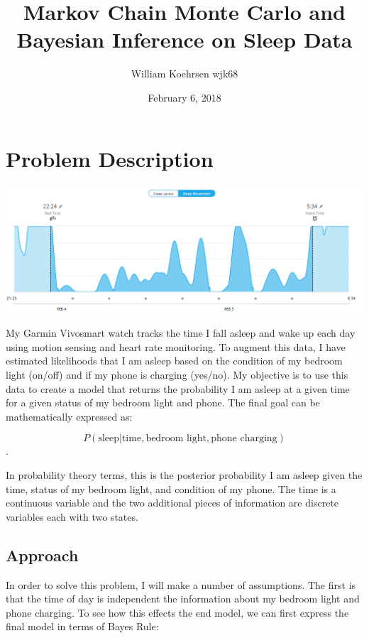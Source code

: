 \documentclass[12pt]{article}
\title{Markov Chain Monte Carlo and Bayesian Inference on Sleep Data}
\author{William Koehrsen wjk68}
\date{February 6, 2018}
\makeatletter
\def\maxwidth{\ifdim\Gin@nat@width>\linewidth\linewidth
    \else\Gin@nat@width\fi}
\let\Oldincludegraphics\includegraphics
\renewcommand{\includegraphics}[1]{\Oldincludegraphics[width=.8\maxwidth]{#1}}
\makeatother
\begin{document}
    
    
    \maketitle
    \tableofcontents
    

    
    \hypertarget{problem-description}{%
\section{Problem Description}\label{problem-description}}

\includegraphics{images/sleep_data_graph.PNG}

My Garmin Vivosmart watch tracks the time I fall asleep and wake up each
day using motion sensing and heart rate monitoring. To augment this
data, I have estimated likelihoods that I am asleep based on the
condition of my bedroom light (on/off) and if my phone is charging
(yes/no). My objective is to use this data to create a model that
returns the probability I am asleep at a given time for a given status
of my bedroom light and phone. The final goal can be mathematically
expressed as:

\[P(\text{sleep} | \text{time}, \text{bedroom light}, \text{phone charging})\].

In probability theory terms, this is the posterior probability I am
asleep given the time, status of my bedroom light, and condition of my
phone. The time is a continuous variable and the two additional pieces
of information are discrete variables each with two states.

    \hypertarget{approach}{%
\subsection{Approach}\label{approach}}

In order to solve this problem, I will make a number of assumptions. The
first is that the time of day is independent the information about my
bedroom light and phone charging. To see how this effects the end model,
we can first express the final model in terms of Bayes Rule:
\end{document}
